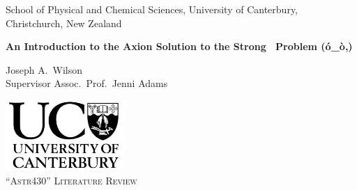 
\begin{titlepage}


\begin{center} \linespread{0.9}
\Large School of Physical and Chemical Sciences, University of Canterbury, Christchurch, New Zealand
\end{center}

\vspace{3cm}

\begin{center}
\huge\bf
An Introduction to the Axion Solution to the Strong \CP\ Problem (ó\_ò,)
\end{center}


\begin{center} \linespread{1.5}
	\Large
	Joseph A.\ Wilson
\\	Supervisor Assoc.\ Prof.\ Jenni Adams
\end{center}

\iftrue
\vspace{3cm}
\centerline{}
\fi

\vfill

\begin{center} \linespread{1.5}
\includegraphics[width=45mm]{resources/UC.png} \\
\vspace{1ex}
\Large \textsc{``Astr430'' Literature Review} \\
\end{center}
\vspace{4pt}

\vspace{2cm}

\end{titlepage}

\restoregeometry
